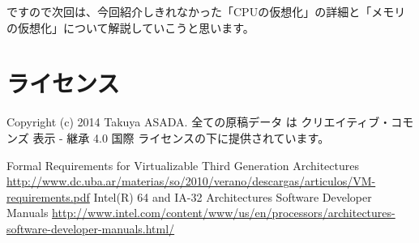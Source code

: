 \documentclass[a4j,12pt]{jarticle}
\begin{document}
ですので次回は、今回紹介しきれなかった「CPUの仮想化」の詳細と「メモリの仮想化」について解説していこうと思います。

\section{ライセンス}
Copyright (c) 2014 Takuya ASADA.
全ての原稿データ は クリエイティブ・コモンズ 表示 - 継承 4.0 国際 ライセンスの下に提供されています。

\begin{thebibliography}{4}
   Formal Requirements for Virtualizable Third Generation Architectures \url{http://www.dc.uba.ar/materias/so/2010/verano/descargas/articulos/VM-requirements.pdf}
   Intel(R) 64 and IA-32 Architectures Software Developer Manuals \url{http://www.intel.com/content/www/us/en/processors/architectures-software-developer-manuals.html/}
\end{thebibliography}
\end{document}
